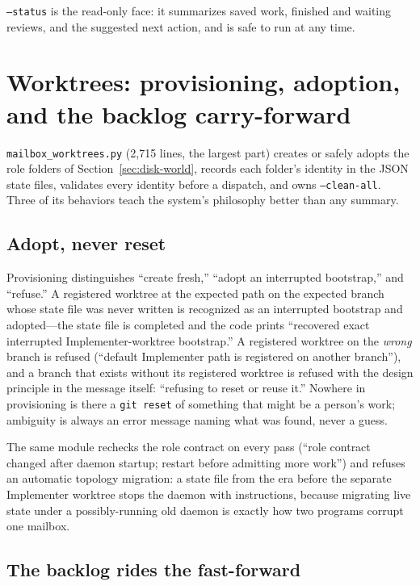 \documentclass[10pt,aps,prd,twocolumn,nofootinbib]{revtex4-2}
\newcommand{\code}[1]{\texttt{#1}}
\newcommand{\file}[1]{\texttt{#1}}
\begin{document}
\code{--status} is the read-only face: it summarizes saved work,
finished and waiting reviews, and the suggested next action, and is
safe to run at any time.

\section{Worktrees: provisioning, adoption, and the backlog
carry-forward}
\label{sec:worktrees}

\file{mailbox\_worktrees.py} (2{,}715 lines, the largest part) creates
or safely adopts the role folders of Section~\ref{sec:disk-world},
records each folder's identity in the JSON state files, validates
every identity before a dispatch, and owns \code{--clean-all}.  Three
of its behaviors teach the system's philosophy better than any
summary.

\subsection{Adopt, never reset}

Provisioning distinguishes ``create fresh,'' ``adopt an interrupted
bootstrap,'' and ``refuse.''  A registered worktree at the expected
path on the expected branch whose state file was never written is
recognized as an interrupted bootstrap and adopted---the state file is
completed and the code prints ``recovered exact interrupted
Implementer-worktree bootstrap.''  A registered worktree on the
\emph{wrong} branch is refused (``default Implementer path is
registered on another branch''), and a branch that exists without its
registered worktree is refused with the design principle in the
message itself: ``refusing to reset or reuse it.''  Nowhere in
provisioning is there a \code{git reset} of something that might be a
person's work; ambiguity is always an error message naming what was
found, never a guess.

The same module rechecks the role contract on every pass
(``role contract changed after daemon startup; restart before
admitting more work'') and refuses an automatic topology migration:
a state file from the era before the separate Implementer worktree
stops the daemon with instructions, because migrating live state under
a possibly-running old daemon is exactly how two programs corrupt one
mailbox.

\subsection{The backlog rides the fast-forward}
\end{document}
